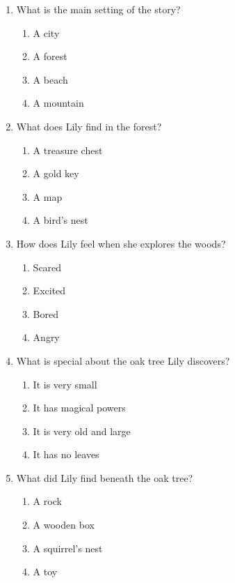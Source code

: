 \documentclass[12pt]{article}
\begin{document}
\begin{enumerate}

    \item What is the main setting of the story?
    \begin{enumerate}[label=\Alph*.]
        \item A city
        \item A forest
        \item A beach
        \item A mountain
    \end{enumerate}
    \vspace{0.5cm}

    \item What does Lily find in the forest?
    \begin{enumerate}[label=\Alph*.]
        \item A treasure chest
        \item A gold key
        \item A map
        \item A bird’s nest
    \end{enumerate}
    \vspace{0.5cm}

\vspace{1cm}

    \item How does Lily feel when she explores the woods?
    \begin{enumerate}[label=\Alph*.]
        \item Scared
        \item Excited
        \item Bored
        \item Angry
    \end{enumerate}
    \vspace{0.5cm}

    \item What is special about the oak tree Lily discovers?
    \begin{enumerate}[label=\Alph*.]
        \item It is very small
        \item It has magical powers
        \item It is very old and large
        \item It has no leaves
    \end{enumerate}
    \vspace{0.5cm}

    \item What did Lily find beneath the oak tree?
    \begin{enumerate}[label=\Alph*.]
        \item A rock
        \item A wooden box
        \item A squirrel’s nest
        \item A toy
    \end{enumerate}
    \vspace{0.5cm}


\end{enumerate}
\end{document}
